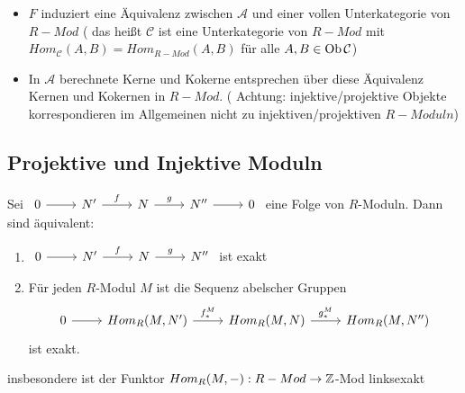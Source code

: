 \begin{anm}
	\begin{itemize}
		\item $F$ induziert eine Äquivalenz zwischen $\mathcal{A}$ und einer vollen Unterkategorie von $R-Mod $ ( das heißt $\mathcal{C} $ ist eine Unterkategorie von $R-Mod $ mit $ Hom_{\mathcal{C}}(A,B)= Hom_{R-Mod}(A,B) $ für alle $ A,B \in \text{Ob}\,\mathcal{C}$)
		\item In $\mathcal{A} $ berechnete Kerne und Kokerne entsprechen über diese Äquivalenz Kernen und Kokernen in $R-Mod$. ( Achtung: injektive/projektive Objekte korrespondieren im Allgemeinen nicht zu injektiven/projektiven $R-Moduln$)
	\end{itemize}
\end{anm}
\newpage 
\subsection{Projektive und Injektive Moduln}
\begin{sa}\label{6.1}
	Sei $\begin{tikzcd}
	0  \arrow{r} & N' \arrow{r}{f} & N \arrow{r}{g} & N'' \arrow{r} & 0
	\end{tikzcd} $ eine Folge von $R$-Moduln. Dann sind äquivalent: 
	\begin{enumerate} [label= \roman*)]
		\item $\begin{tikzcd}
		0  \arrow{r} & N' \arrow{r}{f} & N \arrow{r}{g} & N'' 
		\end{tikzcd} $ ist exakt
		\item Für jeden $R$-Modul $M$ ist die Sequenz abelscher Gruppen  $$\begin{tikzcd}
		0  \arrow{r} & Hom_{R}(M,N') \arrow{r}{f_{*}^{M}} & Hom_{R}(M,N)  \arrow{r}{g_{*}^{M}} & Hom_{R}(M,N'') 
		\end{tikzcd} $$ ist exakt.
	\end{enumerate}
	insbesondere ist der Funktor $Hom_R(M,-): R-Mod \to \mathbb{Z}$-Mod linksexakt
\end{sa}
